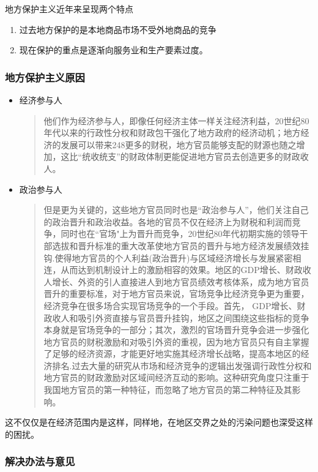 \documentclass[11pt]{article}
\begin{document}
地方保护主义近年来呈现两个特点\\
\begin{enumerate}
\item 过去地方保护的是本地商品市场不受外地商品的竞争
\item 现在保护的重点是逐渐向服务业和生产要素过度。
\end{enumerate}
\subsubsection{地方保护主义原因}
\label{sec:orgbb0a00e}
\begin{itemize}
\item 经济参与人
\begin{quote}
他们作为经济参与人，即像任何经济主体一样关注经济利益，20世纪80年代以来的行政性分权和财政包干强化了地方政府的经济动机；地方经济的发展可以带来248更多的财税，地方官员能够支配的财源也随之增加，这比“统收统支”的财政体制更能促进地方官员去创造更多的财政收人。
\end{quote}
\item 政治参与人
\begin{quote}
但是更为关键的，这些地方官员同时也是“政治参与人”，他们关注自己的政治晋升和政治收益。各地的官员不仅在经济上为财税和利润而竞争，同时也在“官场"上为晋升而竞争，20世纪80年代初期实施的领导干部选拔和晋升标准的重大改革使地方官员的晋升与地方经济发展绩效挂钩.使得地方官员的个人利益(政治晋升)与区域经济增长与发展紧密相连，从而达到机制设计上的激励相容的效果。地区的GDP增长、财政收人增长、外资的引人直接进人到地方官员绩效考核体系，成为地方官员晋升的重要标准，对于地方官员来说，官场竞争比经济竞争更为重要，经济竞争在很多场合实现官场竞争的一个手段。首先， GDP增长、财政收人和吸引外资直接与官员晋升挂钩，地区之间围绕这些指标的竞争本身就是官场竞争的一部分；其次，激烈的官场晋升竞争会进一步强化地方官员的财税激励和对吸引外资的重视，因为地方官员只有自主掌握了足够的经济资源，才能更好地实施其经济增长战略，提高本地区的经济排名.过去大量的研究从市场和经济竞争的逻辑出发强调行政性分权和地方官员的财政激励对区域间经济互动的影响。这种研究角度只注重于我国地方官员的第一种特征，而忽略了地方官员的第二种特征及其影响。
\end{quote}
\end{itemize}
这不仅仅是在经济范围内是这样，同样地，在地区交界之处的污染问题也深受这样的困扰。

\subsubsection{解决办法与意见}
\label{sec:orgd48040e}
\end{document}
